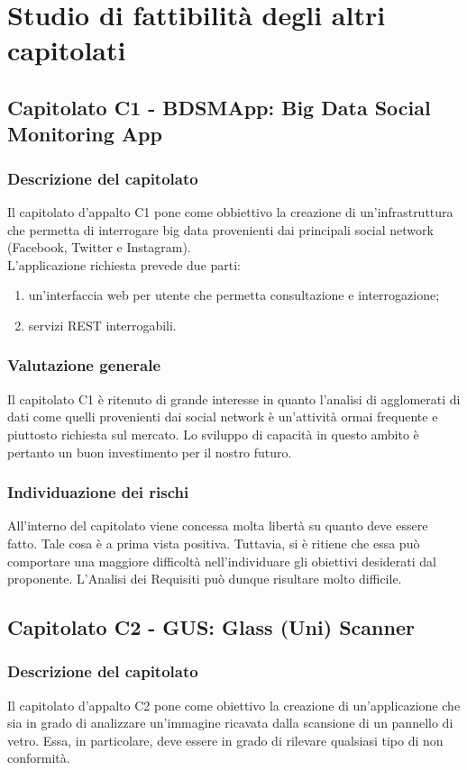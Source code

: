 \section{Studio di fattibilità degli altri capitolati}
	\subsection{Capitolato C1 - BDSMApp: Big Data Social Monitoring App}
		\subsubsection{Descrizione del capitolato}
			Il capitolato d'appalto C1 pone come obbiettivo la creazione di un'infrastruttura che permetta di interrogare big data provenienti dai principali social network (Facebook, Twitter e Instagram).\\
			L'applicazione richiesta prevede due parti:
			\begin{enumerate}
				\item un'interfaccia web per utente che permetta consultazione e interrogazione;
				\item servizi REST interrogabili.
			\end{enumerate}
		\subsubsection{Valutazione generale}
			Il capitolato C1 è ritenuto di grande interesse in quanto l'analisi di agglomerati di dati come quelli provenienti dai social network è un'attività ormai frequente e piuttosto richiesta sul mercato. Lo sviluppo di capacità in questo ambito è pertanto un buon investimento per il nostro futuro.
		\subsubsection{Individuazione dei rischi}
			All'interno del capitolato viene concessa molta libertà su quanto deve essere fatto. Tale cosa è a prima vista positiva. Tuttavia, si è ritiene che essa può comportare una maggiore difficoltà nell'individuare gli obiettivi desiderati dal proponente. L'Analisi dei Requisiti può dunque risultare molto difficile.
	\subsection{Capitolato C2 - GUS: Glass (Uni) Scanner}
		\subsubsection{Descrizione del capitolato}
			Il capitolato d'appalto C2 pone come obiettivo la creazione di un'applicazione che sia in grado di analizzare un'immagine ricavata dalla scansione di un pannello di vetro. Essa, in particolare, deve essere in grado di rilevare qualsiasi tipo di non conformità.
